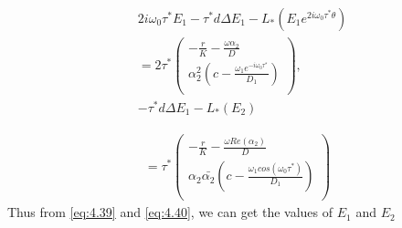 \documentclass[10pt]{amsart}
\theoremstyle{definition}
\begin{document}
\begin{align}\label{eq:4.39}
&2i\omega_0\tau^*E_1-\tau^*d\Delta E_1-L_*(E_1e^{2i\omega_0 \tau^* \theta})\nonumber\\
&=2\tau^{*}
    \left(
    \begin{array}{c}
  {\displaystyle{-\frac{r}{K}-\frac{\omega \alpha_2}{D}}} \\
  {\displaystyle{\alpha_2^2\left(c-\frac{ \omega_1 e^{-i\omega_0 \tau^*}}{D_1}\right)}}\\
\end{array}
\right),\nonumber\\
&-\tau^*d\Delta E_1-L_*(E_2)
\end{align}

\begin{align}\label{eq:4.40}
=\tau^{*}
   \left(
   \begin{array}{c}
  {\displaystyle{-\frac{r}{K}-\frac{\omega Re(\alpha_2)}{D}}} \\
  {\displaystyle{\alpha_2 \bar{\alpha_2}\left(c-\frac{ \omega_1 cos(\omega_0 \tau^*)}{D_1}\right)}}\\
\end{array}
\right)
\end{align}
Thus from \eqref{eq:4.39} and \eqref{eq:4.40}, we can get the values of $E_1$ and $E_2$\\
\end{document}
